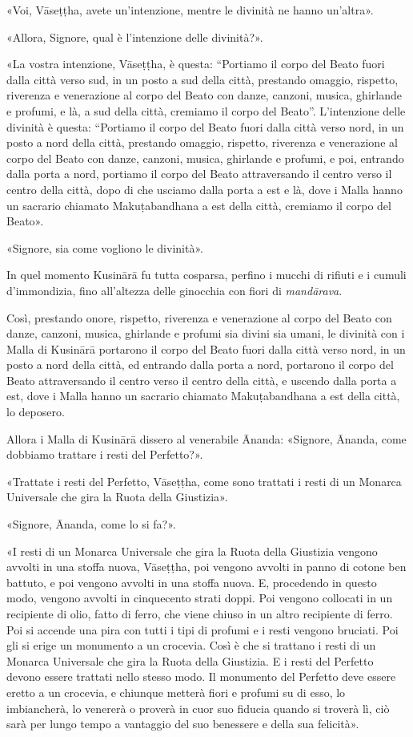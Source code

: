 «Voi, Vāseṭṭha, avete un’intenzione, mentre le divinità ne hanno un’altra».

«Allora, Signore, qual è l’intenzione delle divinità?».

«La vostra intenzione, Vāseṭṭha, è questa: “Portiamo il corpo del Beato fuori
dalla città verso sud, in un posto a sud della città, prestando omaggio,
rispetto, riverenza e venerazione al corpo del Beato con danze, canzoni, musica,
ghirlande e profumi, e là, a sud della città, cremiamo il corpo del Beato”.
L’intenzione delle divinità è questa: “Portiamo il corpo del Beato fuori dalla
città verso nord, in un posto a nord della città, prestando omaggio, rispetto,
riverenza e venerazione al corpo del Beato con danze, canzoni, musica, ghirlande
e profumi, e poi, entrando dalla porta a nord, portiamo il corpo del Beato
attraversando il centro verso il centro della città, dopo di che usciamo dalla
porta a est e là, dove i Malla hanno un sacrario chiamato Makuṭabandhana a est
della città, cremiamo il corpo del Beato».

«Signore, sia come vogliono le divinità».

In quel momento Kusinārā fu tutta cosparsa, perfino i mucchi di rifiuti e i
cumuli d’immondizia, fino all’altezza delle ginocchia con fiori di
\emph{mandārava}.

Così, prestando onore, rispetto, riverenza e venerazione al corpo del Beato con
danze, canzoni, musica, ghirlande e profumi sia divini sia umani, le divinità
con i Malla di Kusinārā portarono il corpo del Beato fuori dalla città verso
nord, in un posto a nord della città, ed entrando dalla porta a nord, portarono
il corpo del Beato attraversando il centro verso il centro della città, e
uscendo dalla porta a est, dove i Malla hanno un sacrario chiamato
Makuṭabandhana a est della città, lo deposero.

Allora i Malla di Kusinārā dissero al venerabile Ānanda: «Signore, Ānanda, come
dobbiamo trattare i resti del Perfetto?».

«Trattate i resti del Perfetto, Vāseṭṭha, come sono trattati i resti di un
Monarca Universale che gira la Ruota della Giustizia».

«Signore, Ānanda, come lo si fa?».

«I resti di un Monarca Universale che gira la Ruota della Giustizia vengono
avvolti in una stoffa nuova, Vāseṭṭha, poi vengono avvolti in panno di cotone
ben battuto, e poi vengono avvolti in una stoffa nuova. E, procedendo in questo
modo, vengono avvolti in cinquecento strati doppi. Poi vengono collocati in un
recipiente di olio, fatto di ferro, che viene chiuso in un altro recipiente di
ferro. Poi si accende una pira con tutti i tipi di profumi e i resti vengono
bruciati. Poi gli si erige un monumento a un crocevia. Così è che si trattano i
resti di un Monarca Universale che gira la Ruota della Giustizia. E i resti del
Perfetto devono essere trattati nello stesso modo. Il monumento del Perfetto
deve essere eretto a un crocevia, e chiunque metterà fiori e profumi su di esso,
lo imbiancherà, lo venererà o proverà in cuor suo fiducia quando si troverà lì,
ciò sarà per lungo tempo a vantaggio del suo benessere e della sua felicità».

